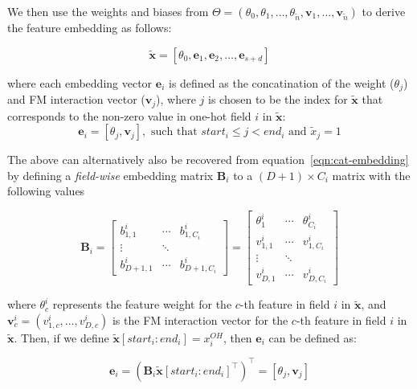 \documentclass{mldsmsc}
\begin{document}
We then use the weights and biases
from $\Theta = (\theta_0, \theta_1, \ldots , \theta_{\tilde{n}}, \mathbf{v}_1, \ldots, \mathbf{v}_{\tilde{n}})$ to
derive the feature embedding as follows:

\begin{equation*}
\tilde{\mathbf{x}} = \left[\theta_0, \mathbf{e}_1, \mathbf{e}_2, \ldots, \mathbf{e}_{s+d}\right]
\end{equation*}

where each embedding vector $\mathbf{e}_i$ is defined as the concatination of
the weight ($\theta_j$) and FM interaction vector ($\mathbf{v}_j$), where $j$ is chosen
to be the index for $\tilde{\mathbf{x}}$ that corresponds to the non-zero value in one-hot field
$i$ in $\tilde{\mathbf{x}}$:
\begin{equation*}
    \mathbf{e}_i = \left[\theta_j, \mathbf{v}_j\right], \text{ such that }start_i \leq j < end_i \text{ and } \tilde{x}_j =1 
\end{equation*}

The above can alternatively also be recovered from equation~\ref{eqn:cat-embedding} by
defining a \emph{field-wise} embedding matrix $\mathbf{B}_i$ to a $(D+1) \times C_i$ matrix with the following
values

\begin{equation*}
\mathbf{B}_i = \begin{bmatrix}
    b_{1,1}^i & \cdots & b_{1 ,C_i}^i\\
    \vdots & \ddots & \\
    b_{D+1, 1}^i & \cdots & b_{D+1, C_i}^i
    \end{bmatrix}
= \begin{bmatrix}
    \theta_{1}^{i} & \cdots & \theta_{C_i}^{i}\\
    v_{1,1}^i & \cdots & v_{1,C_i}^i \\
    \vdots & \ddots & \\
    v_{D,1}^{i
    }& \cdots & v_{D,C_i}^{i}
    \end{bmatrix}
\end{equation*}

where $\theta_{c}^i$ represents the feature weight for the $c$-th feature in field $i$ in $\tilde{\mathbf{x}}$,
and $\mathbf{v}_{c}^i = \left(v_{1,c}^i, \ldots, v_{D,c}^i\right)$ is the FM interaction vector for the
$c$-th feature in field $i$ in $\tilde{\mathbf{x}}$. Then, if we define $\tilde{\mathbf{x}}[start_i : end_i]
= x_i^{OH}$, then $\mathbf{e}_i$ can be defined as:

\begin{equation*}
    \mathbf{e}_i = \left(\mathbf{B}_i \tilde{\mathbf{x}}[start_i : end_i]^{\intercal}\right)^{\intercal}
    = \left[\theta_j, \mathbf{v}_j\right] 
\end{equation*}
\end{document}
